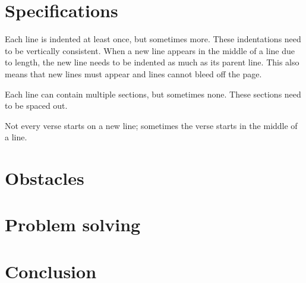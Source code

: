 \documentclass{acm_proc_article-sp}
\begin{document}
\section{Specifications}
Each line is indented at least once, but sometimes more. These indentations need to be vertically consistent. When a new line appears in the middle of a line due to length, the new line needs to be indented as much as its parent line. This also means that new lines must appear and lines cannot bleed off the page.

Each line can contain multiple sections, but sometimes none. These sections need to be spaced out.

Not every verse starts on a new line; sometimes the verse starts in the middle of a line. 

\section{Obstacles}
\section{Problem solving}
\section{Conclusion}

\end{document}
